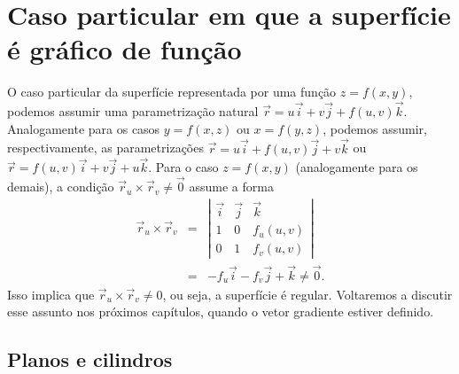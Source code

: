 \section{Caso particular em que a superfície é gráfico de função}
O caso particular da superfície representada por uma função $z=f(x,y)$, podemos assumir uma parametrização natural $\vec{r}=u\vec{i}+v\vec{j}+f(u,v)\vec{k}$. Analogamente para os casos $y=f(x,z)$ ou $x=f(y,z)$, podemos assumir, respectivamente, as parametrizações $\vec{r}=u\vec{i}+f(u,v)\vec{j}+v\vec{k}$ ou $\vec{r}=f(u,v)\vec{i}+v\vec{j}+u\vec{k}$. Para o caso $z=f(x,y)$ (analogamente para os demais), a condição $\vec{r}_u\times \vec{r}_v\neq \vec{0}$ assume a forma
\begin{eqnarray*}
 \vec{r}_u\times \vec{r}_v&=&\left|\begin{array}{ccc}\vec{i}&\vec{j}&\vec{k}\\ 1&0&f_u(u,v)\\0&1&f_v(u,v)\end{array} \right|\\&=&-f_u\vec{i}-f_v\vec{j}+\vec{k}\neq \vec{0}.
\end{eqnarray*}
Isso implica que $ \vec{r}_u\times \vec{r}_v \neq 0$, ou seja, a superfície \'{e} regular. Voltaremos a discutir esse assunto nos próximos capítulos, quando o vetor gradiente estiver definido.


\subsection{Planos e cilindros}
